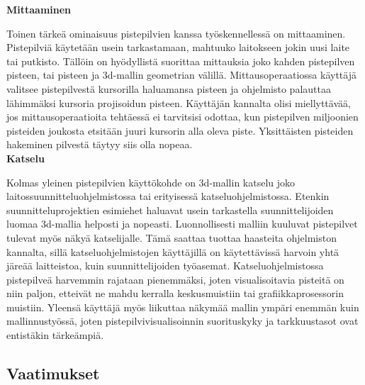 \large\textbf{Mittaaminen}
\normalsize

\noindent Toinen tärkeä ominaisuus pistepilvien kanssa työskennellessä on mittaaminen. Pistepilviä käytetään usein tarkastamaan, mahtuuko laitokseen jokin uusi laite tai putkisto. Tällöin on hyödyllistä suorittaa mittauksia joko kahden pistepilven pisteen, tai pisteen ja 3d-mallin geometrian välillä. Mittausoperaatiossa käyttäjä valitsee pistepilvestä kursorilla haluamansa pisteen ja ohjelmisto palauttaa lähimmäksi kursoria projisoidun pisteen. Käyttäjän kannalta olisi miellyttävää, jos mittausoperaatioita tehtäessä ei tarvitsisi odottaa, kun pistepilven miljoonien pisteiden joukosta etsitään juuri kursorin alla oleva piste. Yksittäisten pisteiden hakeminen pilvestä täytyy siis olla nopeaa.\\

\large\textbf{Katselu}
\normalsize

\noindent Kolmas yleinen pistepilvien käyttökohde on 3d-mallin katselu joko laitossuunnitteluohjelmistossa tai erityisessä katseluohjelmistossa. Etenkin suunnitteluprojektien esimiehet haluavat usein tarkastella suunnittelijoiden luomaa 3d-mallia helposti ja nopeasti. Luonnollisesti malliin kuuluvat pistepilvet tulevat myös näkyä katselijalle. Tämä saattaa tuottaa haasteita ohjelmiston kannalta, sillä katseluohjelmistojen käyttäjillä on käytettävissä harvoin yhtä järeää laitteistoa, kuin suunnittelijoiden työasemat. Katseluohjelmistossa pistepilveä harvemmin rajataan pienemmäksi, joten visualisoitavia pisteitä on niin paljon, etteivät ne mahdu kerralla keskusmuistiin tai grafiikkaprosessorin muistiin. Yleensä käyttäjä myös liikuttaa näkymää mallin ympäri enemmän kuin mallinnustyössä, joten pistepilvivisualisoinnin suorituskyky ja tarkkuustasot ovat entistäkin tärkeämpiä.

\subsection{Vaatimukset}

